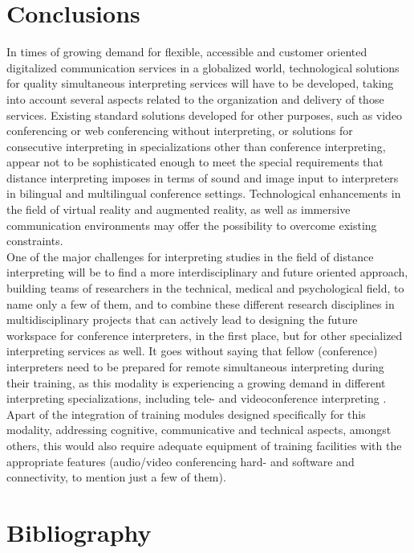 \documentclass[output=paper]{langsci/langscibook}
\begin{document}
\section{Conclusions}
In times of growing demand for flexible, accessible and customer oriented digitalized communication services in a globalized world, technological solutions for quality simultaneous interpreting services will have to be developed, taking into account several aspects related to the organization and delivery of those services. Existing standard solutions developed for other purposes, such as video conferencing or web conferencing without interpreting, or solutions for consecutive interpreting in specializations other than conference interpreting, appear not to be sophisticated enough to meet the special requirements that distance interpreting imposes in terms of sound and image input to interpreters in bilingual and multilingual conference settings. Technological enhancements in the field of virtual reality and augmented reality, as well as immersive communication environments may offer the possibility to overcome existing constraints. \\
One of the major challenges for interpreting studies in the field of distance interpreting will be to find a more interdisciplinary and future oriented approach, building teams of researchers in the technical, medical and psychological field, to name only a few of them, and to combine these different research disciplines in multidisciplinary projects that can actively lead to designing the future workspace for conference interpreters, in the first place, but for other specialized interpreting services as well. It goes without saying that fellow (conference) interpreters need to be prepared for remote simultaneous interpreting during their training, as this modality is experiencing a growing demand in different interpreting specializations, including tele- and videoconference interpreting \citep{Braun2015}. Apart of the integration of training modules designed specifically for this modality, addressing cognitive, communicative and technical aspects, amongst others, this would also require adequate equipment of training facilities with the appropriate features (audio/video conferencing hard- and software and connectivity, to mention just a few of them).
\section{Bibliography}
\end{document}
